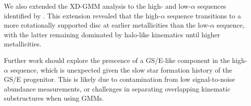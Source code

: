 \documentclass[a4paper,12pt]{article}
\begin{document}
We also extended the XD-GMM analysis to the high- and low-$\alpha$ sequences identified by \citet{Vis2024}.
This extension revealed that the high-$\alpha$ sequence transitions to a more rotationally supported disc at
earlier metallicities than the low-$\alpha$ sequence, with the latter remaining dominated by halo-like
kinematics until higher metallicities.

Further work should explore the prescence of a GS/E-like component in the high-$\alpha$ sequence,
which is unexpected given the slow star formation history of the GS/E progenitor. This is likely due 
to contamination from low signal-to-noise abundance measurements, or challenges in separating 
overlapping kinematic substructures when using GMMs. 





\newpage


\end{document}
